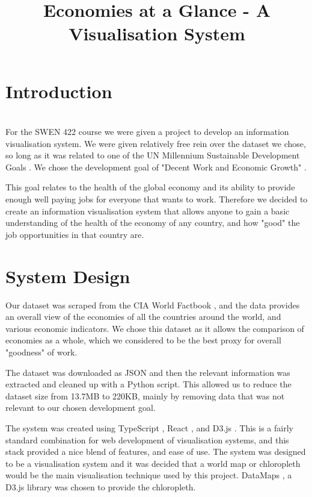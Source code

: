 \documentclass[10pt, journal]{IEEEtran}
\begin{document}
\title{Economies at a Glance - A Visualisation System}
\author{
}
\maketitle

\section{Introduction}
~\\
For the SWEN 422 course we were given a project to develop an information visualisation system. We were given relatively free rein over the dataset we chose, so long as it was related to one of the UN Millennium Sustainable Development Goals \cite{devgoals}. We chose the development goal of "Decent Work and Economic Growth" \cite{dec}. 

This goal relates to the health of the global economy and its ability to provide enough well paying jobs for everyone that wants to work. Therefore we decided to create an information visualisation system that allows anyone to gain a basic understanding of the health of the economy of any country, and how "good" the job opportunities in that country are.



\section{System Design}

Our dataset was scraped from the CIA World Factbook \cite{cia}, and the data provides an overall view of the economies of all the countries around the world, and various economic indicators. We chose this dataset as it allows the comparison of economies as a whole, which we considered to be the best proxy for overall "goodness" of work.

The dataset was downloaded as JSON and then the relevant information was extracted and cleaned up with a Python script. This allowed us to reduce the dataset size from 13.7MB to 220KB, mainly by removing data that was not relevant to our chosen development goal.

The system was created using TypeScript \cite{ts}, React \cite{react}, and D3.js \cite{d3}. This is a fairly standard combination for web development of visualisation systems, and this stack provided a nice blend of features, and ease of use. The system was designed to be a visualisation system and it was decided that a world map or chloropleth would be the main visualisation technique used by this project. DataMaps \cite{dms}, a D3.js library was chosen to provide the chloropleth.
\end{document}
